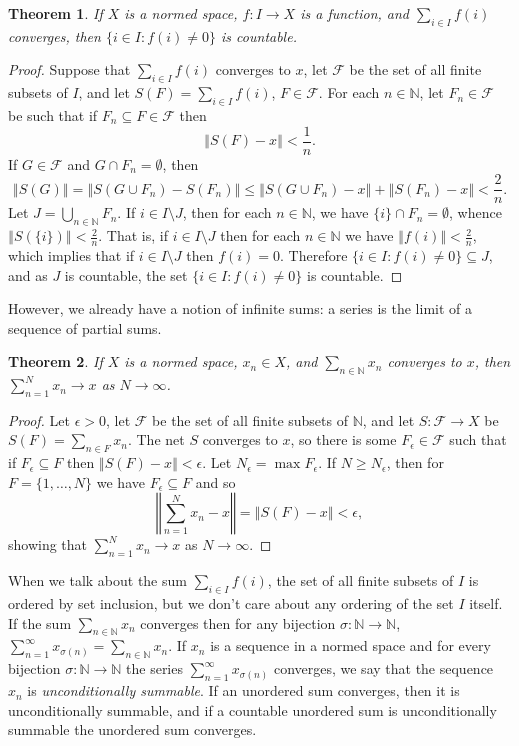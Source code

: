 \documentclass{article}
\newcommand{\norm}[1]{\left\Vert #1 \right\Vert}
\newtheorem{theorem}{Theorem}
\begin{document}
\begin{theorem}
If $X$ is a   normed space, $f:I \to X$ is a function, and $\sum_{i \in I} f(i)$ converges, then $\{i \in I: f(i) \neq 0\}$ is countable.
\end{theorem}
\begin{proof}
Suppose that $\sum_{i \in I} f(i)$ converges to $x$,
let $\mathscr{F}$ be the set of all finite subsets of $I$, and let $S(F)=\sum_{i \in I} f(i)$, $F \in \mathscr{F}$.
For each $n \in \mathbb{N}$, let $F_n \in \mathscr{F}$ be such that if $F_n \subseteq F \in \mathscr{F}$ then
\[
\norm{S(F)-x}<\frac{1}{n}.
\]
If $G \in \mathscr{F}$ and $G \cap F_n = \emptyset$, then
\[
\norm{S(G)} = \norm{S(G \cup F_n) - S(F_n)}
\leq \norm{S(G \cup F_n) -x} + \norm{S(F_n) - x}<\frac{2}{n}.
\]
Let $J=\bigcup_{n \in \mathbb{N}} F_n$. If $i \in I \setminus J$, then for each $n \in \mathbb{N}$,
we have
$\{i\} \cap F_n = \emptyset$, whence $\norm{S(\{i\})} < \frac{2}{n}$.
 That is, if $i \in I \setminus J$ then for each $n \in \mathbb{N}$ we have $\norm{f(i)} < \frac{2}{n}$, which implies that if $i \in I \setminus J$ then
 $f(i)=0$.
Therefore $\{i \in I: f(i) \neq 0\} \subseteq J$, and as $J$ is countable, the set $\{i \in I:f(i) \neq 0\}$ is
countable.
\end{proof}

However, we already have a notion of infinite sums: a series is the limit of a sequence of partial
sums. 

\begin{theorem}
If $X$ is a normed space, $x_n \in X$,  and $\sum_{n \in \mathbb{N}} x_n$ converges to $x$, then
$\sum_{n=1}^N x_n \to x$ as $N \to \infty$.
\label{generalizedsum}
\end{theorem}
\begin{proof}
Let $\epsilon>0$,  let $\mathscr{F}$ be the set of all finite subsets of $\mathbb{N}$, and let $S:\mathscr{F} \to X$ be
$S(F)=\sum_{n \in F} x_n$. The net $S$ converges to $x$, so there is some $F_\epsilon \in \mathscr{F}$ such that if $F_\epsilon \subseteq F$ then
$\norm{S(F)-x}< \epsilon$. Let $N_\epsilon=\max F_\epsilon$. If $N \geq N_\epsilon$, then for $F=\{1,\ldots,N\}$ we have $F_\epsilon \subseteq F$ and so
\[
\norm{\sum_{n=1}^N x_n - x}=\norm{S(F)-x} < \epsilon,
\]
showing that $\sum_{n=1}^N x_n \to x$ as $N \to \infty$.
\end{proof}

When we talk about the sum $\sum_{i \in I} f(i)$, the set of all finite subsets of $I$ is ordered by set inclusion, but we don't care about any
ordering of the set $I$ itself. If the sum $\sum_{n \in \mathbb{N}} x_n$ converges then for any bijection $\sigma:\mathbb{N} \to \mathbb{N}$,
$\sum_{n=1}^\infty x_{\sigma(n)}=\sum_{n \in \mathbb{N}} x_n$. If $x_n$ is a sequence in a normed space and for every
bijection $\sigma:\mathbb{N} \to \mathbb{N}$ the series $\sum_{n=1}^\infty x_{\sigma(n)}$ converges, we say that the sequence
$x_n$ is {\em unconditionally summable}. If an unordered sum converges, then it is unconditionally summable, and if a countable
unordered sum is unconditionally summable the unordered sum converges.
\end{document}
